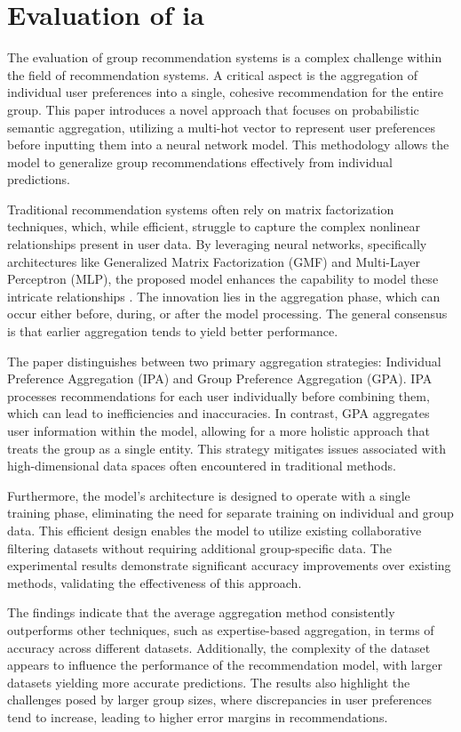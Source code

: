 \documentclass[runningheads]{llncs}
\begin{document}
\section{Evaluation of ia}
The evaluation of group recommendation systems is a complex challenge within the field of recommendation systems. A critical aspect is the aggregation of individual user preferences into a single, cohesive recommendation for the entire group. This paper introduces a novel approach that focuses on probabilistic semantic aggregation, utilizing a multi-hot vector to represent user preferences before inputting them into a neural network model. This methodology allows the model to generalize group recommendations effectively from individual predictions.

Traditional recommendation systems often rely on matrix factorization techniques, which, while efficient, struggle to capture the complex nonlinear relationships present in user data. By leveraging neural networks, specifically architectures like Generalized Matrix Factorization (GMF) and Multi-Layer Perceptron (MLP), the proposed model enhances the capability to model these intricate relationships \cite{Duenas-Lerin,_2023}. The innovation lies in the aggregation phase, which can occur either before, during, or after the model processing. The general consensus is that earlier aggregation tends to yield better performance.

The paper distinguishes between two primary aggregation strategies: Individual Preference Aggregation (IPA) and Group Preference Aggregation (GPA). IPA processes recommendations for each user individually before combining them, which can lead to inefficiencies and inaccuracies. In contrast, GPA aggregates user information within the model, allowing for a more holistic approach that treats the group as a single entity. This strategy mitigates issues associated with high-dimensional data spaces often encountered in traditional methods.

Furthermore, the model's architecture is designed to operate with a single training phase, eliminating the need for separate training on individual and group data. This efficient design enables the model to utilize existing collaborative filtering datasets without requiring additional group-specific data. The experimental results demonstrate significant accuracy improvements over existing methods, validating the effectiveness of this approach.

The findings indicate that the average aggregation method consistently outperforms other techniques, such as expertise-based aggregation, in terms of accuracy across different datasets. Additionally, the complexity of the dataset appears to influence the performance of the recommendation model, with larger datasets yielding more accurate predictions. The results also highlight the challenges posed by larger group sizes, where discrepancies in user preferences tend to increase, leading to higher error margins in recommendations.
\end{document}
